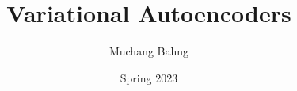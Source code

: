 \documentclass{article}
\begin{document}

\title{Variational Autoencoders}
\author{Muchang Bahng}
\date{Spring 2023}

\maketitle
\tableofcontents
\pagebreak 










\end{document}
